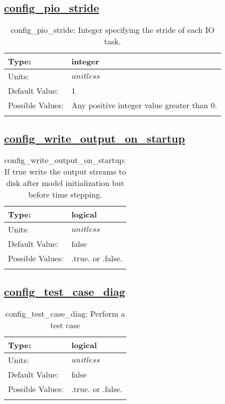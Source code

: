 \subsection[config\_pio\_stride]{\hyperref[sec:nm_tab_io]{config\_pio\_stride}}
\label{subsec:nm_sec_config_pio_stride}
\begin{center}
\begin{longtable}{| p{2.0in} || p{4.0in} |}
    \hline
    Type: & integer \\
    \hline
    Units: & $unitless$ \\
    \hline
    Default Value: & 1 \\
    \hline
    Possible Values: & Any positive integer value greater than 0. \\
    \hline
    \caption{config\_pio\_stride: Integer specifying the stride of each IO task.}
\end{longtable}
\end{center}
\subsection[config\_write\_output\_on\_startup]{\hyperref[sec:nm_tab_io]{config\_write\_output\_on\_startup}}
\label{subsec:nm_sec_config_write_output_on_startup}
\begin{center}
\begin{longtable}{| p{2.0in} || p{4.0in} |}
    \hline
    Type: & logical \\
    \hline
    Units: & $unitless$ \\
    \hline
    Default Value: & false \\
    \hline
    Possible Values: & .true. or .false. \\
    \hline
    \caption{config\_write\_output\_on\_startup: If true write the output streams to disk after model initialization but before time stepping.}
\end{longtable}
\end{center}
\subsection[config\_test\_case\_diag]{\hyperref[sec:nm_tab_io]{config\_test\_case\_diag}}
\label{subsec:nm_sec_config_test_case_diag}
\begin{center}
\begin{longtable}{| p{2.0in} || p{4.0in} |}
    \hline
    Type: & logical \\
    \hline
    Units: & $unitless$ \\
    \hline
    Default Value: & false \\
    \hline
    Possible Values: & .true. or .false. \\
    \hline
    \caption{config\_test\_case\_diag: Perform a test case}
\end{longtable}
\end{center}
